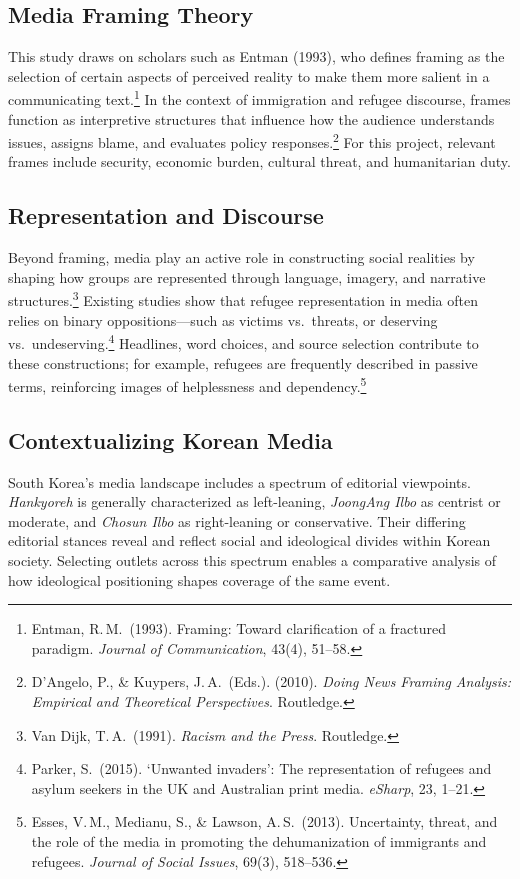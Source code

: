 \documentclass[11pt,a4paper]{article}
\begin{document}
\subsection{Media Framing Theory}

This study draws on scholars such as Entman (1993), who defines framing as the selection of certain aspects of perceived reality to make them more salient in a communicating text.\footnote{Entman, R.\,M.\ (1993). Framing: Toward clarification of a fractured paradigm. \textit{Journal of Communication}, 43(4), 51--58.} In the context of immigration and refugee discourse, frames function as interpretive structures that influence how the audience understands issues, assigns blame, and evaluates policy responses.\footnote{D'Angelo, P., \& Kuypers, J.\,A.\ (Eds.). (2010). \textit{Doing News Framing Analysis: Empirical and Theoretical Perspectives}. Routledge.} For this project, relevant frames include security, economic burden, cultural threat, and humanitarian duty.

\subsection{Representation and Discourse}

Beyond framing, media play an active role in constructing social realities by shaping how groups are represented through language, imagery, and narrative structures.\footnote{Van Dijk, T.\,A.\ (1991). \textit{Racism and the Press}. Routledge.} Existing studies show that refugee representation in media often relies on binary oppositions---such as victims vs.\ threats, or deserving vs.\ undeserving.\footnote{Parker, S.\ (2015). `Unwanted invaders': The representation of refugees and asylum seekers in the UK and Australian print media. \textit{eSharp}, 23, 1--21.} Headlines, word choices, and source selection contribute to these constructions; for example, refugees are frequently described in passive terms, reinforcing images of helplessness and dependency.\footnote{Esses, V.\,M., Medianu, S., \& Lawson, A.\,S.\ (2013). Uncertainty, threat, and the role of the media in promoting the dehumanization of immigrants and refugees. \textit{Journal of Social Issues}, 69(3), 518--536.}

\subsection{Contextualizing Korean Media}

South Korea's media landscape includes a spectrum of editorial viewpoints. \textit{Hankyoreh} is generally characterized as left-leaning, \textit{JoongAng Ilbo} as centrist or moderate, and \textit{Chosun Ilbo} as right-leaning or conservative. Their differing editorial stances reveal and reflect social and ideological divides within Korean society. Selecting outlets across this spectrum enables a comparative analysis of how ideological positioning shapes coverage of the same event.
\end{document}
